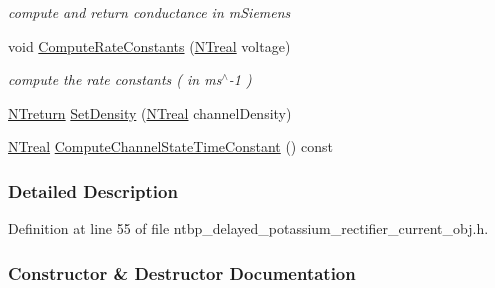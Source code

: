 \begin{DoxyCompactItemize}
\begin{DoxyCompactList}\small\item\em compute and return conductance in mSiemens \item\end{DoxyCompactList}\item 
void \hyperlink{class_n_t_b_p__delayed__potassium__rectifier__current__o_a6de67c85587e037d7e29bc6583020858}{ComputeRateConstants} (\hyperlink{nt__types_8h_a814a97893e9deb1eedcc7604529ba80d}{NTreal} voltage)
\begin{DoxyCompactList}\small\item\em compute the rate constants ( in ms$^\wedge$-\/1 ) \item\end{DoxyCompactList}\item 
\hyperlink{nt__types_8h_ab9564ee8f091e809d21b8451c6683c53}{NTreturn} \hyperlink{class_n_t_b_p__delayed__potassium__rectifier__current__o_afa0c3e34392f931d05508c806668a8ac}{SetDensity} (\hyperlink{nt__types_8h_a814a97893e9deb1eedcc7604529ba80d}{NTreal} channelDensity)
\item 
\hyperlink{nt__types_8h_a814a97893e9deb1eedcc7604529ba80d}{NTreal} \hyperlink{class_n_t_b_p__delayed__potassium__rectifier__current__o_a2440fa2d90a5e1d8c28ef7c8310662ff}{ComputeChannelStateTimeConstant} () const 
\end{DoxyCompactItemize}


\subsubsection{Detailed Description}


Definition at line 55 of file ntbp\_\-delayed\_\-potassium\_\-rectifier\_\-current\_\-obj.h.



\subsubsection{Constructor \& Destructor Documentation}
